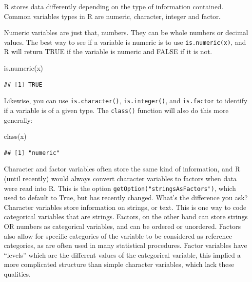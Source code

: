 \documentclass[
]{article}
\newenvironment{Shaded}{\begin{snugshade}}{\end{snugshade}}
\newcommand{\FunctionTok}[1]{\textcolor[rgb]{0.00,0.00,0.00}{#1}}
\newcommand{\NormalTok}[1]{#1}
\begin{document}
R stores data differently depending on the type of information
contained. Common variables types in R are numeric, character, integer
and factor.

Numeric variables are just that, numbers. They can be whole numbers or
decimal values. The best way to see if a variable is numeric is to use
\texttt{is.numeric(x)}, and R will return TRUE if the variable is numeric and
FALSE if it is not.

\begin{Shaded}
\begin{Highlighting}[]
\FunctionTok{is.numeric}\NormalTok{(x)}
\end{Highlighting}
\end{Shaded}

\begin{verbatim}
## [1] TRUE
\end{verbatim}

Likewise, you can use \texttt{is.character()}, \texttt{is.integer()}, and \texttt{is.factor}
to identify if a variable is of a given type. The \texttt{class()} function
will also do this more generally:

\begin{Shaded}
\begin{Highlighting}[]
\FunctionTok{class}\NormalTok{(x)}
\end{Highlighting}
\end{Shaded}

\begin{verbatim}
## [1] "numeric"
\end{verbatim}

Character and factor variables often store the same kind of information,
and R (until recently) would always convert character variables to
factors when data were read into R. This is the option
\texttt{getOption("stringsAsFactors")}, which used to default to True, but has
recently changed. What's the difference you ask? Character variables
store information on strings, or text. This is one way to code
categorical variables that are strings. Factors, on the other hand can
store strings OR numbers as categorical variables, and can be ordered or
unordered. Factors also allow for specific categories of the variable to
be considered as reference categories, as are often used in many
statistical procedures. Factor variables have ``levels'' which are the
different values of the categorical variable, this implied a more
complicated structure than simple character variables, which lack these
qualities.
\end{document}
